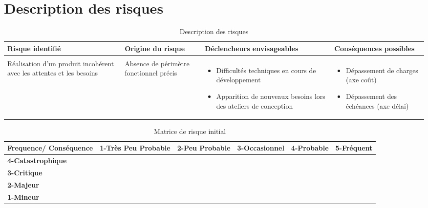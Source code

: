 \documentclass[12pt]{article}
\begin{document}
\section{Description des risques}
\begin{landscape}
\begin{table}[H]
\scriptsize
\caption{Description des risques}
\begin{tabular}{p{}p{3.5cm}p{6.75cm} p{6.75cm}}
\hline Risque identifié & \bf Origine du risque & \bf Déclencheurs envisageables & \bf Conséquences possibles \\
\hline
&&&\\
Réalisation d’un produit incohérent avec les attentes et les besoins & Absence de périmètre fonctionnel précis\cellcolor{blue!50} & 
 \begin{itemize}
\item Difficultés techniques en cours de développement
 			\item Apparition de nouveaux besoins lors des ateliers de conception
 			\cellcolor{green!50}
 \end{itemize} & 
 \begin{itemize}
 	\item Dépassement de charges (axe coût)
 	\item Dépassement des échéances (axe délai)
 \end{itemize}
 \cellcolor{red!50}\\


\hline
\end{tabular}
\end{table}
\end{landscape}


\begin{table}[H]
\centering
\scriptsize
\caption{Matrice de risque initial}
\begin{tabular}{|p{2cm}|p{2cm}|p{2cm}| p{2cm} |p{2cm}| p{2cm}|}
\hline \bf Frequence/ Conséquence & \bf 1-Très Peu Probable & \bf 2-Peu Probable & \bf 3-Occasionnel & \bf 4-Probable & \bf 5-Fréquent\\ [10pt]
\hline \bf 4-Catastrophique & \cellcolor{yellow!50} & \cellcolor{red!50} & \cellcolor{red!50} & \cellcolor{red!50} &\cellcolor{red!50} \\ [10pt]
\hline \bf 3-Critique &\cellcolor{green!50} & \cellcolor{yellow!50} & \cellcolor{yellow!50} & \cellcolor{red!50} &\cellcolor{red!50} \\ [10pt]
\hline \bf 2-Majeur & \cellcolor{green!50} & \cellcolor{green!50} & \cellcolor{yellow!50} &\cellcolor{yellow!50} &\cellcolor{red!50} \\ [10pt]
\hline \bf 1-Mineur & \cellcolor{green!50} & \cellcolor{green!50} & \cellcolor{green!50} &\cellcolor{yellow!50} &\cellcolor{yellow!50} \\ [10pt]
\hline
\end{tabular} \\
\end{table}
\end{document}
